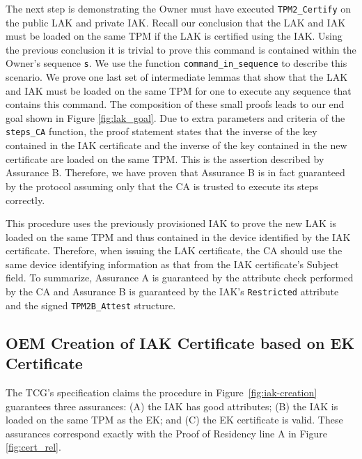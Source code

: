 \documentclass[runningheads]{llncs}
\begin{document}
The next step is demonstrating the Owner must have executed
\verb|TPM2_Certify| on the public LAK and private IAK.  Recall our
conclusion that the LAK and IAK must be loaded on the same TPM if the
LAK is certified using the IAK. Using the previous conclusion it is
trivial to prove this command is contained within the Owner's sequence
\verb|s|.  We use the function \verb|command_in_sequence| to describe
this scenario.  We prove one last set of intermediate lemmas that show
that the LAK and IAK must be loaded on the same TPM for one to execute
any sequence that contains this command.  The composition of these
small proofs leads to our end goal shown in Figure
\ref{fig:lak_goal}. Due to extra parameters and criteria of the
\verb|steps_CA| function, the proof statement states that the inverse
of the key contained in the IAK certificate and the inverse of the key
contained in the new certificate are loaded on the same TPM.  This is
the assertion described by Assurance B.  Therefore, we have proven
that Assurance B is in fact guaranteed by the protocol assuming only
that the CA is trusted to execute its steps correctly.

This procedure uses the previously provisioned IAK to prove the
new LAK is loaded on the same TPM and thus contained in the device
identified by the IAK certificate. Therefore, when issuing the LAK
certificate, the CA should use the same device identifying information
as that from the IAK certificate's Subject field. To summarize,
Assurance A is guaranteed by the attribute check performed by the CA
and Assurance B is guaranteed by the IAK's \verb|Restricted| attribute
and the signed \verb|TPM2B_Attest| structure.

\subsection{OEM Creation of IAK Certificate based on EK Certificate}

The TCG's specification claims the procedure in
Figure~\ref{fig:iak-creation} guarantees three assurances: (A) the IAK
has good attributes; (B) the IAK is loaded on the same TPM as the EK;
and (C) the EK certificate is valid. These assurances correspond
exactly with the Proof of Residency line A in Figure
\ref{fig:cert_rel}.
\end{document}
